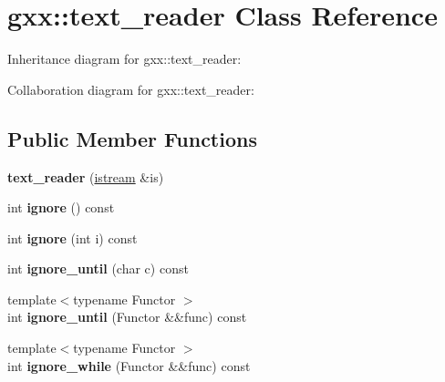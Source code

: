 \hypertarget{classgxx_1_1text__reader}{}\section{gxx\+:\+:text\+\_\+reader Class Reference}
\label{classgxx_1_1text__reader}


Inheritance diagram for gxx\+:\+:text\+\_\+reader\+:


Collaboration diagram for gxx\+:\+:text\+\_\+reader\+:
\subsection*{Public Member Functions}
\begin{DoxyCompactItemize}
\item 
{\bfseries text\+\_\+reader} (\hyperlink{classgxx_1_1istream}{istream} \&is)\hypertarget{classgxx_1_1text__reader_a08d8cc2fa3dee77e59e4b6d917bc18d6}{}\label{classgxx_1_1text__reader_a08d8cc2fa3dee77e59e4b6d917bc18d6}

\item 
int {\bfseries ignore} () const \hypertarget{classgxx_1_1text__reader_a155a81ad88fc95b9478cfb01999c444b}{}\label{classgxx_1_1text__reader_a155a81ad88fc95b9478cfb01999c444b}

\item 
int {\bfseries ignore} (int i) const \hypertarget{classgxx_1_1text__reader_a5bcd35d9aabbddba8f1bfb08a7d09ac0}{}\label{classgxx_1_1text__reader_a5bcd35d9aabbddba8f1bfb08a7d09ac0}

\item 
int {\bfseries ignore\+\_\+until} (char c) const \hypertarget{classgxx_1_1text__reader_afea2204b774966cc28a2d87a9216b886}{}\label{classgxx_1_1text__reader_afea2204b774966cc28a2d87a9216b886}

\item 
{\footnotesize template$<$typename Functor $>$ }\\int {\bfseries ignore\+\_\+until} (Functor \&\&func) const \hypertarget{classgxx_1_1text__reader_a271b461cdc0e3d25c76955fc9e093acb}{}\label{classgxx_1_1text__reader_a271b461cdc0e3d25c76955fc9e093acb}

\item 
{\footnotesize template$<$typename Functor $>$ }\\int {\bfseries ignore\+\_\+while} (Functor \&\&func) const \hypertarget{classgxx_1_1text__reader_a5fc0b7cf5d3674367e40d433699c87c7}{}\label{classgxx_1_1text__reader_a5fc0b7cf5d3674367e40d433699c87c7}


\end{DoxyCompactItemize}
